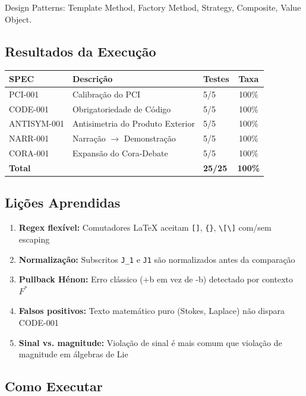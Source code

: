 \documentclass[
  brazilian,
  12pt,
]{article}
\begin{document}
Design Patterns: Template Method, Factory Method, Strategy, Composite, Value Object.

\subsection*{Resultados da Execução}

\begin{longtable}[]{@{}lllc@{}}
\toprule
SPEC & Descrição & Testes & Taxa \\
\midrule
\endhead
PCI-001 & Calibração do PCI & 5/5 & 100\% \\
CODE-001 & Obrigatoriedade de Código & 5/5 & 100\% \\
ANTISYM-001 & Antisimetria do Produto Exterior & 5/5 & 100\% \\
NARR-001 & Narração $\rightarrow$ Demonstração & 5/5 & 100\% \\
CORA-001 & Expansão do Cora-Debate & 5/5 & 100\% \\
\midrule
\textbf{Total} & & \textbf{25/25} & \textbf{100\%} \\
\bottomrule
\end{longtable}

\subsection*{Lições Aprendidas}

\begin{enumerate}
    \item \textbf{Regex flexível:} Comutadores LaTeX aceitam \texttt{{[}{]}}, \texttt{\{\}}, \texttt{\textbackslash{[}\textbackslash{]}} com/sem escaping
    \item \textbf{Normalização:} Subscritos \texttt{J\_1} e \texttt{J1} são normalizados antes da comparação
    \item \textbf{Pullback Hénon:} Erro clássico (+b em vez de -b) detectado por contexto $F^{*}$
    \item \textbf{Falsos positivos:} Texto matemático puro (Stokes, Laplace) não dispara CODE-001
    \item \textbf{Sinal vs. magnitude:} Violação de sinal é mais comum que violação de magnitude em álgebras de Lie
\end{enumerate}

\subsection*{Como Executar}
\end{document}
